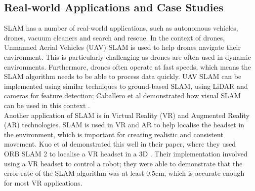 \documentclass[12pt]{article}
\begin{document}
\subsection{Real-world Applications and Case Studies} %
SLAM has a number of real-world applications, such as autonomous vehicles, drones, vacuum cleaners and search and rescue.
In the context of drones, Unmanned Aerial Vehicles (UAV) SLAM is used to help drones navigate their environment. This is
particularly challenging as drones are often used in dynamic environments. Furthermore, drones often operate at fast speeds,
which means the SLAM algorithm needs to be able to process data quickly. UAV SLAM can be implemented using similar techniques
to ground-based SLAM, using LiDAR and cameras for feature detection; Caballero et al demonstrated how visual SLAM can be used
in this context \cite{UAV_SLAM}.\\
Another application of SLAM is in Virtual Reality (VR) and Augmented Reality (AR) technologies. SLAM is used in VR and AR to
help localise the headset in the environment, which is important for creating realistic and consistent movement. Kuo et al
demonstrated this well in their paper, where they used ORB SLAM 2 to localise a VR headset in a 3D \cite{VR_SLAM}. Their
implementation involved using a VR headset to control a robot; they were able to demonstrate that the error rate of the SLAM
algorithm was at least 0.5cm, which is accurate enough for most VR applications.\\
\end{document}
